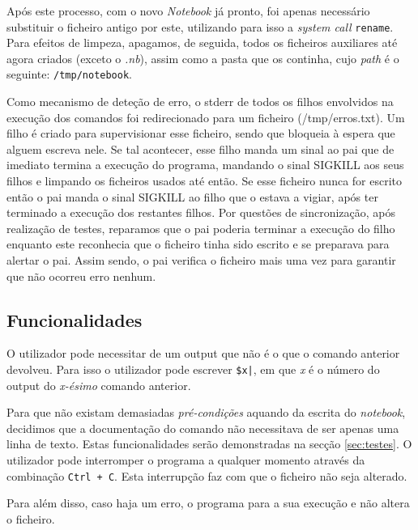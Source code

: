 \documentclass[a4paper]{article}
\begin{document}
Após este processo, com o novo \textit{Notebook} já pronto, foi apenas necessário substituir o ficheiro antigo por este, utilizando para isso a \textit{system call} 
\texttt{rename}. Para efeitos de limpeza, apagamos, de seguida, todos os ficheiros auxiliares até agora criados (exceto o \textit{.nb}), assim como a pasta que os 
continha, cujo \textit{path} é o seguinte: \texttt{/tmp/notebook}.


Como mecanismo de deteção de erro, o stderr de todos os filhos envolvidos na execução dos comandos foi redirecionado para um ficheiro (/tmp/erros.txt). 
Um filho é criado para supervisionar esse ficheiro, sendo que bloqueia à espera que alguem escreva nele. Se tal acontecer, esse filho manda um sinal ao pai que 
de imediato termina a execução do programa, mandando o sinal SIGKILL aos seus filhos e limpando os ficheiros usados até então. Se esse ficheiro nunca for escrito 
então o pai manda o sinal SIGKILL ao filho que o estava a vigiar, após ter terminado a execução dos restantes filhos. Por questões de sincronização, após realização 
de testes, reparamos que o pai poderia terminar a execução do filho enquanto este reconhecia que o ficheiro tinha sido escrito e se preparava para alertar o pai. 
Assim sendo, o pai verifica o ficheiro mais uma vez para garantir que não ocorreu erro nenhum.

\subsection{Funcionalidades}
\label{sec:funcionalidades}

O utilizador pode necessitar de um output que não é o que o comando anterior devolveu. Para isso o utilizador pode escrever 
\texttt{\$x|}, em que \textit{x} é o número do output do \textit{x-ésimo} comando anterior. 

Para que não existam demasiadas \textit{pré-condições} aquando da escrita do \textit{notebook}, decidimos que a documentação do 
comando não necessitava de ser apenas uma linha de texto.
Estas funcionalidades serão demonstradas na secção \ref{sec:testes}.
O utilizador pode interromper o programa a qualquer momento através da combinação \texttt{Ctrl + C}. Esta interrupção faz com que o 
ficheiro não seja alterado.

Para além disso, caso haja um erro, o programa para a sua execução e não altera o ficheiro.



\end{document}

